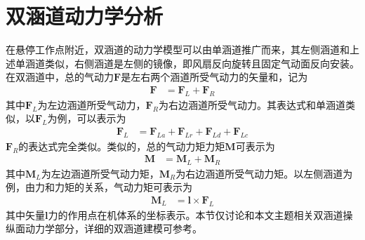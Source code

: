 \section{双涵道动力学分析}
在悬停工作点附近，双涵道的动力学模型可以由单涵道推广而来，其左侧涵道和上述单涵道类似，右侧涵道是左侧的镜像，即风扇反向旋转且固定气动面反向安装。在双涵道中，总的气动力$ \bm{F} $是左右两个涵道所受气动力的矢量和，记为
\begin{align}
\bm{F}&=\bm{F}_{L}+\bm{F}_{R}
\end{align}
其中$ \bm{F}_{L} $为左边涵道所受气动力，$ \bm{F}_{R} $为右边涵道所受气动力。其表达式和单涵道类似，以$ \bm{F}_{L} $为例，可以表示为
\begin{align}
\bm{F}_{L} &=\bm{F}_{La}+\bm{F}_{Lr}+\bm{F}_{Ld}+\bm{F}_{Lc} 
\end{align}
$ \bm{F}_{R} $的表达式完全类似。类似的，总的气动力矩力矩$ \bm{M} $可表示为
\begin{align}
\bm{M}&=\bm{M}_{L}+\bm{M}_{R}
\end{align}
其中$ \bm{M}_{L} $为左边涵道所受气动力矩，$ \bm{M}_{R} $为右边涵道所受气动力矩。以左侧涵道为例，由力和力矩的关系，气动力矩可表示为
\begin{align}
\bm{M}_{L} &=\bm{l} \times \bm{F}_{L}  
\end{align}
其中矢量$ \bm{l} $力的作用点在机体系的坐标表示。本节仅讨论和本文主题相关双涵道操纵面动力学部分，详细的双涵道建模可参考\cite{Speck_2013,Speck_2013a}。
